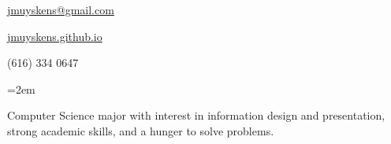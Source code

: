 \documentclass{scrartcl}
\date{} %
\newlength{\datebox}\settowidth{\datebox}{Spring 2011} %
\newcommand{\NewEntry}[3]{\noindent\hangindent=2em\hangafter=0 \parbox{\datebox}{\small \textit{#1}}\hspace{1.0em} #2 #3 %
\vspace{0.2em}} %
\newcommand{\Description}[1]{\hangindent=2em\hangafter=0\noindent\raggedright\footnotesize{#1}\par\normalsize\vspace{1em}} %
\begin{document}
\thispagestyle{empty} %


\begin{cv}{}%
\noindent \hrulefill




\hfill \href{mailto:jmuyskens@gmail.com}{jmuyskens@gmail.com} %

\hfill \href{http://jmuyskens.github.io}{jmuyskens.github.io} %

\hfill (616) 334 0647 %


%
%



\noindent{}

\vspace{1em}

\Description{Computer Science major with interest in information design and presentation, strong academic skills, and a hunger to solve problems.}



\end{cv}
\end{document}
